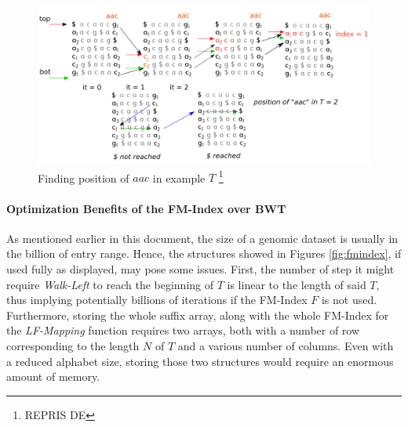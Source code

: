 \begin{figure}[H]
    \centering
    \includegraphics[scale=0.4]{Figures/MATCH.png}
    \caption{Finding position of $aac$ in example $T$ \footnote{REPRIS DE}}
    \label{fig:match}
\end{figure}

\paragraph{Optimization Benefits of the FM-Index over BWT}

As mentioned earlier in this document, the size of a genomic dataset is usually in the billion of entry range. Hence, the structures showed in Figures \ref{fig:fmindex}, if used fully as displayed, may pose some issues. First, the number of step it might require \textsl{Walk-Left} to reach the beginning of $T$ is linear to the length of said $T$, thus implying potentially billions of iterations if the FM-Index $F$ is not used. Furthermore, storing the whole suffix array, along with the whole FM-Index for the \textsl{LF-Mapping} function requires two arrays, both with a number of row corresponding to the length $N$ of $T$ and a various number of columns. Even with a reduced alphabet size, storing those two structures would require an enormous amount of memory. \\

